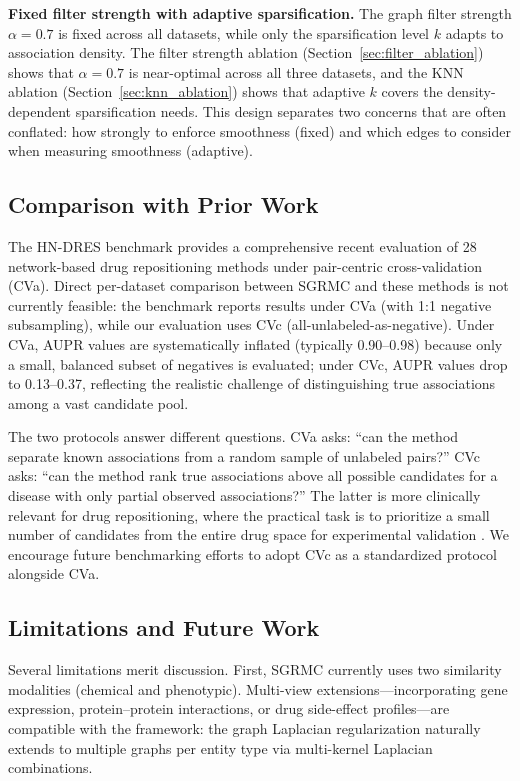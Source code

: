 \documentclass[webpdf,modern,large]{oup-authoring-template}
\begin{document}
\noindent\textbf{Fixed filter strength with adaptive sparsification.}
The graph filter strength $\alpha = 0.7$ is fixed across all datasets, while only the sparsification level $k$ adapts to association density. The filter strength ablation (Section~\ref{sec:filter_ablation}) shows that $\alpha = 0.7$ is near-optimal across all three datasets, and the KNN ablation (Section~\ref{sec:knn_ablation}) shows that adaptive $k$ covers the density-dependent sparsification needs. This design separates two concerns that are often conflated: how strongly to enforce smoothness (fixed) and which edges to consider when measuring smoothness (adaptive).

\subsection{Comparison with Prior Work}

The HN-DRES benchmark \cite{li2024hn_dres} provides a comprehensive recent evaluation of 28 network-based drug repositioning methods under pair-centric cross-validation (CVa). Direct per-dataset comparison between SGRMC and these methods is not currently feasible: the benchmark reports results under CVa (with 1:1 negative subsampling), while our evaluation uses CVc (all-unlabeled-as-negative). Under CVa, AUPR values are systematically inflated (typically 0.90--0.98) because only a small, balanced subset of negatives is evaluated; under CVc, AUPR values drop to 0.13--0.37, reflecting the realistic challenge of distinguishing true associations among a vast candidate pool.

The two protocols answer different questions. CVa asks: ``can the method separate known associations from a random sample of unlabeled pairs?'' CVc asks: ``can the method rank true associations above all possible candidates for a disease with only partial observed associations?'' The latter is more clinically relevant for drug repositioning, where the practical task is to prioritize a small number of candidates from the entire drug space for experimental validation \cite{gottlieb2011}. We encourage future benchmarking efforts to adopt CVc as a standardized protocol alongside CVa.

\subsection{Limitations and Future Work}

Several limitations merit discussion. First, SGRMC currently uses two similarity modalities (chemical and phenotypic). Multi-view extensions---incorporating gene expression, protein--protein interactions, or drug side-effect profiles---are compatible with the framework: the graph Laplacian regularization naturally extends to multiple graphs per entity type via multi-kernel Laplacian combinations.
\end{document}
